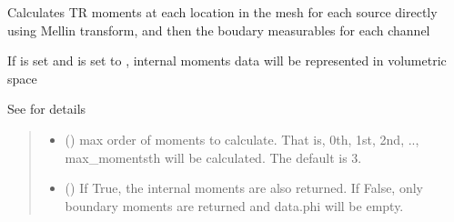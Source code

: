 \documentclass[letterpaper,10pt,english]{sphinxmanual}
\begin{document}
\begin{fulllineitems}
\begin{fulllineitems}
\end{fulllineitems}


\begin{fulllineitems}
\label{\detokenize{_autosummary/nirfasterff.base.stnd_mesh.stndmesh:nirfasterff.base.stnd_mesh.stndmesh.femdata_moments}}
\pysigstartsignatures
\pysiglinewithargsret
{}
{\sphinxparamcomma {}\sphinxparamcomma {}\sphinxparamcomma {}}
{}
\pysigstopsignatures
\sphinxAtStartPar
Calculates TR moments at each location in the mesh for each source directly using Mellin transform, and then the boudary measurables for each channel

\sphinxAtStartPar
If  is set and  is set to , internal moments data will be represented in volumetric space

\sphinxAtStartPar
See {\hyperref[\detokenize{_autosummary/nirfasterff.forward.femdata.femdata_stnd_TR_moments:nirfasterff.forward.femdata.femdata_stnd_TR_moments}]{}} for details
\begin{quote}\begin{description}
\begin{itemize}
\item {} 
\sphinxAtStartPar
{} (\sphinxstyleliteralemphasis{\sphinxupquote{, }}) \textendash{} max order of moments to calculate. That is, 0th, 1st, 2nd, .., max\_moments\sphinxhyphen{}th will be calculated. The default is 3.

\item {} 
\sphinxAtStartPar
{} (\sphinxstyleliteralemphasis{\sphinxupquote{, }}) \textendash{} 
\sphinxAtStartPar
If True, the internal moments are also returned. If False, only boundary moments are returned and data.phi will be empty.


\end{itemize}
\end{description}
\end{quote}
\end{fulllineitems}
\end{fulllineitems}
\end{document}

